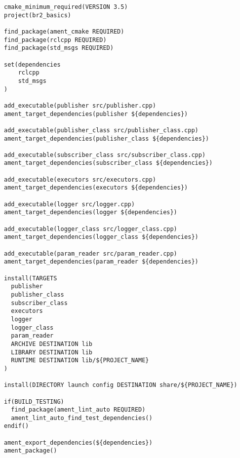  \footnotesize
\begin{tcolorbox}[sharp corners, colframe=gray!80, colback=LightGray, left=0pt, top=0pt, bottom=0pt, title=\texttt{br2\_basics/CMakeLists.txt}]
  \begin{verbatim}
cmake_minimum_required(VERSION 3.5)
project(br2_basics)

find_package(ament_cmake REQUIRED)
find_package(rclcpp REQUIRED)
find_package(std_msgs REQUIRED)

set(dependencies
    rclcpp
    std_msgs
)

add_executable(publisher src/publisher.cpp)
ament_target_dependencies(publisher ${dependencies})

add_executable(publisher_class src/publisher_class.cpp)
ament_target_dependencies(publisher_class ${dependencies})

add_executable(subscriber_class src/subscriber_class.cpp)
ament_target_dependencies(subscriber_class ${dependencies})

add_executable(executors src/executors.cpp)
ament_target_dependencies(executors ${dependencies})

add_executable(logger src/logger.cpp)
ament_target_dependencies(logger ${dependencies})

add_executable(logger_class src/logger_class.cpp)
ament_target_dependencies(logger_class ${dependencies})

add_executable(param_reader src/param_reader.cpp)
ament_target_dependencies(param_reader ${dependencies})

install(TARGETS
  publisher
  publisher_class
  subscriber_class
  executors
  logger
  logger_class
  param_reader
  ARCHIVE DESTINATION lib
  LIBRARY DESTINATION lib
  RUNTIME DESTINATION lib/${PROJECT_NAME}
)

install(DIRECTORY launch config DESTINATION share/${PROJECT_NAME})

if(BUILD_TESTING)
  find_package(ament_lint_auto REQUIRED)
  ament_lint_auto_find_test_dependencies()
endif()

ament_export_dependencies(${dependencies})
ament_package()
    \end{verbatim}
    \end{tcolorbox}
  \normalsize

